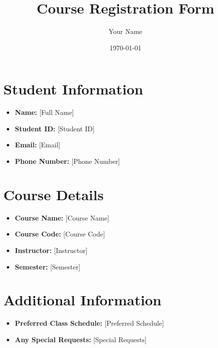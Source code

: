 \documentclass{article}
\begin{document}
\title{Course Registration Form}
\author{Your Name}
\date{\today}

\maketitle

\section{Student Information}

\begin{itemize}
  \item \textbf{Name:} [Full Name]
  \item \textbf{Student ID:} [Student ID]
  \item \textbf{Email:} [Email]
  \item \textbf{Phone Number:} [Phone Number]
\end{itemize}

\section{Course Details}

\begin{itemize}
  \item \textbf{Course Name:} [Course Name]
  \item \textbf{Course Code:} [Course Code]
  \item \textbf{Instructor:} [Instructor]
  \item \textbf{Semester:} [Semester]
\end{itemize}

\section{Additional Information}

\begin{itemize}
  \item \textbf{Preferred Class Schedule:} [Preferred Schedule]
  \item \textbf{Any Special Requests:} [Special Requests]
\end{itemize}
\end{document}
